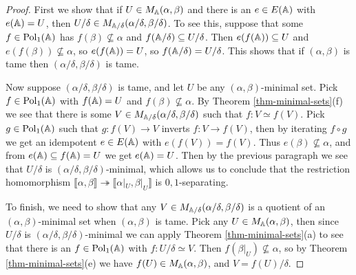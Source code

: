 \begin{appendices}
\begin{proof}
First we show that if $U \in M_{\mathbb{A}}(\alpha,\beta)$ and there is an $e \in E(\mathbb{A})$ with $e(\mathbb{A}) = U$, then $U/\delta \in M_{\mathbb{A}/\delta}(\alpha/\delta,\beta/\delta)$. To see this, suppose that some $f \in \operatorname{Pol}_1(\mathbb{A})$ has $f(\beta) \not\subseteq \alpha$ and $f(\mathbb{A}/\delta) \subseteq U/\delta$. Then $e(f(\mathbb{A})) \subseteq U$ and $e(f(\beta)) \not\subseteq \alpha$, so $e(f(\mathbb{A})) = U$, so $f(\mathbb{A}/\delta) = U/\delta$. This shows that if $(\alpha,\beta)$ is tame then $(\alpha/\delta, \beta/\delta)$ is tame.

Now suppose $(\alpha/\delta, \beta/\delta)$ is tame, and let $U$ be any $(\alpha,\beta)$-minimal set. Pick $f \in \operatorname{Pol}_1(\mathbb{A})$ with $f(\mathbb{A}) = U$ and $f(\beta) \not\subseteq \alpha$. By Theorem \ref{thm-minimal-sets}(f) we see that there is some $V \in M_{\mathbb{A}/\delta}(\alpha/\delta, \beta/\delta)$ such that $f : V \simeq f(V)$. Pick $g \in \operatorname{Pol}_1(\mathbb{A})$ such that $g : f(V) \rightarrow V$ inverts $f : V \rightarrow f(V)$, then by iterating $f\circ g$ we get an idempotent $e \in E(\mathbb{A})$ with $e(f(V)) = f(V)$. Thus $e(\beta) \not\subseteq \alpha$, and from $e(\mathbb{A}) \subseteq f(\mathbb{A}) = U$ we get $e(\mathbb{A}) = U$. Then by the previous paragraph we see that $U/\delta$ is $(\alpha/\delta,\beta/\delta)$-minimal, which allows us to conclude that the restriction homomorphism $\llbracket \alpha, \beta \rrbracket \twoheadrightarrow \llbracket \alpha|_U, \beta|_U \rrbracket$ is $0,1$-separating.

To finish, we need to show that any $V \in M_{\mathbb{A}/\delta}(\alpha/\delta,\beta/\delta)$ is a quotient of an $(\alpha,\beta)$-minimal set when $(\alpha,\beta)$ is tame. Pick any $U \in M_{\mathbb{A}}(\alpha,\beta)$, then since $U/\delta$ is $(\alpha/\delta,\beta/\delta)$-minimal we can apply Theorem \ref{thm-minimal-sets}(a) to see that there is an $f \in \operatorname{Pol}_1(\mathbb{A})$ with $f : U/\delta \simeq V$. Then $f(\beta|_U) \not\subseteq \alpha$, so by Theorem \ref{thm-minimal-sets}(e) we have $f(U) \in M_{\mathbb{A}}(\alpha,\beta)$, and $V = f(U)/\delta$.
\end{proof}

\begin{comment}
\begin{prop} If $(\alpha,\beta)$ is a tame congruence quotient on a finite algebra $\bA$, and if $C$ is a congruence class of $\beta$ which is not also a congruence class of $\alpha$, then $\bA|_C/\alpha|_C$ is a tame algebra.
\end{prop}
\begin{proof} By Corollary \ref{cor-trace-closure}, there is some $(\alpha,\beta)$-trace $N$ of some $(\alpha,\beta)$-minimal set $U$ such that $N \subseteq C$. By Theorem \ref{thm-minimal-sets}(b), there is some idempotent $e \in E(\bA)$ such that $e(\bA) = U$. Since $e$ preserves $\beta$ and $e(N) = N \subseteq C$, we must have $e(C) \subseteq C$, so $e \in E(\bA|_C)$. We will prove that $N = U \cap C$ is an $(\alpha|_C,1_C)$-minimal set of $\bA|_C$, and that the restriction homomorphism $\llbracket \alpha|_C, 1_C \rrbracket \twoheadrightarrow \llbracket \alpha|_N, 1_N \rrbracket$ is $0,1$-separating - this will allow us to apply the previous proposition.


\end{comment}
\end{appendices}
